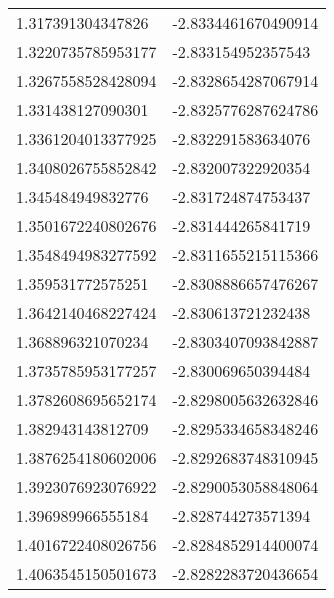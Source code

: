 \begin{supertabular}{ll}
1.317391304347826   & -2.8334461670490914  \\
1.3220735785953177  & -2.833154952357543   \\
1.3267558528428094  & -2.8328654287067914  \\
1.331438127090301   & -2.8325776287624786  \\
1.3361204013377925  & -2.832291583634076   \\
1.3408026755852842  & -2.832007322920354   \\
1.345484949832776   & -2.831724874753437   \\
1.3501672240802676  & -2.831444265841719   \\
1.3548494983277592  & -2.8311655215115366  \\
1.359531772575251   & -2.8308886657476267  \\
1.3642140468227424  & -2.830613721232438   \\
1.368896321070234   & -2.8303407093842887  \\
1.3735785953177257  & -2.830069650394484   \\
1.3782608695652174  & -2.8298005632632846  \\
1.382943143812709   & -2.8295334658348246  \\
1.3876254180602006  & -2.8292683748310945  \\
1.3923076923076922  & -2.8290053058848064  \\
1.396989966555184   & -2.828744273571394   \\
1.4016722408026756  & -2.8284852914400074  \\
1.4063545150501673  & -2.8282283720436654  \\
\end{supertabular}
